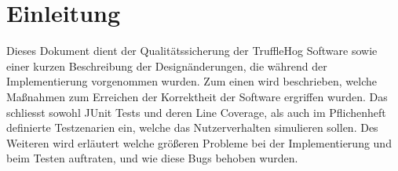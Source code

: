 \chapter{Einleitung}

Dieses Dokument dient der Qualitätssicherung der TruffleHog Software sowie einer kurzen Beschreibung der Designänderungen, die während der Implementierung vorgenommen wurden.
Zum einen wird beschrieben, welche Maßnahmen zum Erreichen der Korrektheit der Software ergriffen wurden. Das schliesst sowohl JUnit Tests und deren Line Coverage, als auch im Pflichenheft definierte Testzenarien ein, welche das Nutzerverhalten simulieren sollen. Des Weiteren wird erläutert welche größeren Probleme bei der Implementierung und beim Testen auftraten, und wie diese Bugs behoben wurden.